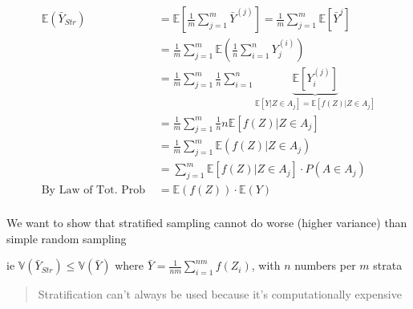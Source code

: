 \documentclass[
  oneside]{book}
\begin{document}
\[
\begin{aligned}
\mathbb{E}(\bar{Y}_{Str}) &= \mathbb{E}\left[ \frac{1}{m}\sum^{m}_{j=1}\bar{Y}^{(j)} \right] = \frac{1}{m}\sum^{m}_{j=1} \mathbb{E}[\bar{Y}^{j}]\\
&= \frac{1}{m} \sum^{m}_{j=1} \mathbb{E} \left( \frac{1}{n}\sum^{n}_{i=1} Y_{j}^{(i)} \right)\\
&= \frac{1}{m}\sum^{m}_{j=1} \frac{1}{n}\sum^{n}_{i=1}\underbrace{ \mathbb{E}\left[ Y_{i}^{(j)} \right]  }_{ \mathbb{E}[Y | Z \in A_{j}] = \mathbb{E}\left[ f(Z) | Z \in A_{j} \right]  }\\
&= \frac{1}{m} \sum^{m}_{j=1} \frac{1}{n}n \mathbb{E}[f(Z)|Z \in A_{j}]\\
&= \frac{1}{m} \sum^{m}_{j=1} \mathbb{E}(f(Z)|Z \in A_{j})\\
&= \sum^{m}_{j=1}\mathbb{E}\left[ f(Z) | Z \in A_{j}\right] \cdot P(A \in A_{j})\\
\text{By Law of Tot. Prob }&= \mathbb{E}(f(Z)) \cdot \mathbb{E}(Y)\\
\end{aligned}
\]

We want to show that stratified sampling cannot do worse (higher variance) than simple random sampling

ie \(\mathbb{V}(\bar{Y}_{Str}) \leq \mathbb{V}(\bar{Y})\) where \(\bar{Y} = \frac{1}{nm} \sum^{nm}_{i=1}f(Z_{i})\), with \(n\) numbers per \(m\) strata

\begin{quote}
Stratification can't always be used because it's computationally expensive
\end{quote}
\end{document}
